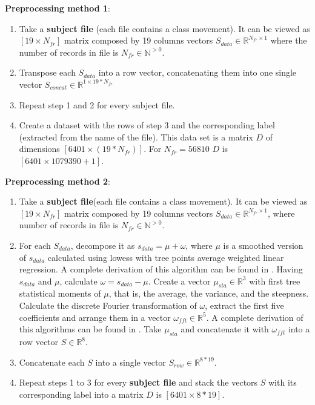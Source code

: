\textbf{Preprocessing method 1}:
\begin{enumerate}
	\item Take a \textbf{subject file} (each file contains a class movement). It can be viewed as $[19 \times N_{fr}]$ matrix composed by 19 columns vectors $S_{data} \in \mathbb{R}^{N_{fr} \times 1}$  where the number of records in file is $N_{fr} \in \mathbb{N}^{>0}$.
	\item Transpose each $S_{data}$ into a row vector, concatenating them into one single vector $S_{concat} \in  \mathbb{R}^{1 \times 19*N_{fr} }$
	\item Repeat step 1 and 2 for every subject file.
	\item Create a dataset with the rows of step 3 and the corresponding label (extracted from the name of the file). This data set is a matrix $D$ of dimensions $[6401 \times (19*N_{fr})]$. For $N_{fr}=56810$ $D$ is $[6401 \times 1079390+1]$.
\end{enumerate}

\textbf{Preprocessing method 2}:
\begin{enumerate}
	\item Take a \textbf{subject file}(each file contains a class movement). It can be viewed as $[19 \times N_{fr}]$ matrix composed by 19 columns vectors $S_{data} \in \mathbb{R}^{N_{fr} \times 1}$, where number of records in file is $N_{fr} \in \mathbb{N}^{>0}$.
	\item For each $S_{data}$, decompose it as $s_{data}=\mu+\omega$, where $\mu$ is a smoothed version of $s_{data}$ calculated using lowess with tree points average weighted linear regression. A complete derivation of this algorithm can be found in \cite{cleveland1979robust}. Having $s_{data}$ and $\mu$, calculate $\omega =s_{data}-\mu$. Create a vector $\mu_{sta} \in \mathbb{R}^{3}$ with first tree statistical moments of $\mu$, that is, the average, the variance, and the steepness. Calculate the discrete Fourier transformation of $\omega$, extract the first five coefficients and arrange them in a vector $\omega_{fft} \in \mathbb{R}^{5}$. A complete derivation of this algorithms can be found in \cite{oraintara2002integer}.
	Take $\mu_{sta}$ and concatenate it with $\omega_{fft}$ into a row vector $S \in \mathbb{R}^{8}$.
	\item Concatenate each $S$ into a single vector $S_{row} \in \mathbb{R}^{8*19}$.
	\item Repeat steps 1 to 3 for every \textbf{subject file} and stack the vectors $S$ with its corresponding label into a matrix $D$ is $[6401 \times 8*19]$.
\end{enumerate}

